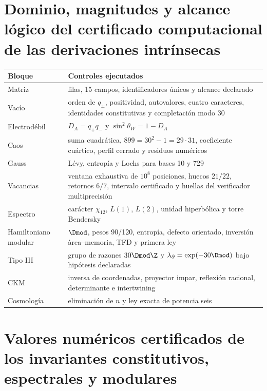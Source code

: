\section{Dominio, magnitudes y alcance lógico del certificado computacional de las derivaciones intrínsecas}

\begin{longtable}{@{}>{\raggedright\arraybackslash}p{}>{\raggedright\arraybackslash}p{}@{}}
\toprule
Bloque & Controles ejecutados\\
\midrule
\endhead
Matriz & 58 filas, 15 campos, identificadores únicos y alcance declarado\\
Vac\'io & orden de \(q_\pm\), positividad, autovalores, cuatro caracteres, identidades constitutivas y completaci\'on modo 30\\
Electrod\'ebil & \(D_A=q_+q_-\) y \(\sin^2\theta_W=1-D_A\)\\
Caos & suma cuadr\'atica, \(899=30^2-1=29\cdot31\), coeficiente cu\'artico, perfil cerrado y residuos num\'ericos\\
Gauss & L\'evy, entrop\'ia y Lochs para bases 10 y 729\\
Vacancias & ventana exhaustiva de \(10^8\) posiciones, huecos \(21/22\), retornos \(6/7\), intervalo certificado y huellas del verificador multiprecisi\'on\\
Espectro & car\'acter \(\chi_{12}\), \(L(1)\), \(L(2)\), unidad hiperb\'olica y torre Bendersky\\
Hamiltoniano modular & \(\Dmod\), pesos 90/120, entrop\'ia, defecto orientado, inversi\'on \`area--memoria, TFD y primera ley\\
Tipo III & grupo de razones \(30\Dmod\Z\) y \(\lambda_\partial=\exp(-30\Dmod)\) bajo hip\'otesis declaradas\\
CKM & inversa de coordenadas, proyector impar, reflexi\'on racional, determinante e intertwining\\
Cosmolog\'ia & eliminaci\'on de \(n\) y ley exacta de potencia seis\\
\bottomrule
\end{longtable}

\section{Valores numéricos certificados de los invariantes constitutivos, espectrales y modulares}

